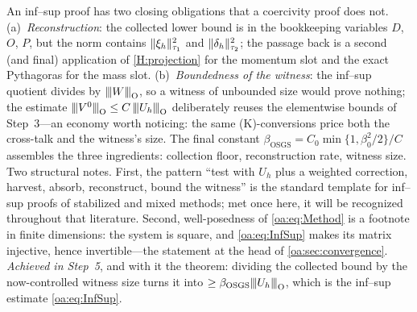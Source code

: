 \begin{pedagogy}
An inf--sup proof has two closing obligations that a coercivity proof does not.
(a)~\emph{Reconstruction}: the collected lower bound is in the bookkeeping
variables $D$, $O$, $P$, but the norm contains $\lVert \xi_h \rVert_{\tau_1}^2$ and
$\lVert \delta_h \rVert_{\tau_2}^2$; the passage back is a second (and final)
application of \cref{H:projection} for the momentum slot and the exact
Pythagoras for the mass slot. (b)~\emph{Boundedness of the witness}: the
inf--sup quotient divides by ${\lvert\kern-0.25ex\lvert\kern-0.25ex\lvert W \rvert\kern-0.25ex\rvert\kern-0.25ex\rvert}_{\mathrm O}$, so a witness of unbounded
size would prove nothing; the estimate ${\lvert\kern-0.25ex\lvert\kern-0.25ex\lvert V^0 \rvert\kern-0.25ex\rvert\kern-0.25ex\rvert}_{\mathrm O} \le
C\,{\lvert\kern-0.25ex\lvert\kern-0.25ex\lvert U_h \rvert\kern-0.25ex\rvert\kern-0.25ex\rvert}_{\mathrm O}$ deliberately reuses the elementwise bounds of
Step~3---an economy worth noticing: the same (K)-conversions price both the
cross-talk and the witness's size. The final constant $\beta_{\mathrm{OSGS}} =
C_0\min\{1,\beta_0^2/2\}/C$ assembles the three ingredients: collection floor,
reconstruction rate, witness size. Two structural notes. First, the pattern
``test with $U_h$ plus a weighted correction, harvest, absorb, reconstruct,
bound the witness'' is the standard template for inf--sup proofs of stabilized
and mixed methods; met once here, it will be recognized throughout that
literature. Second, well-posedness of \cref{oa:eq:Method} is a footnote in
finite dimensions: the system is square, and \cref{oa:eq:InfSup} makes its
matrix injective, hence invertible---the statement at the head of
\cref{oa:sec:convergence}.
\emph{Achieved in Step~5}, and with it the theorem: dividing the collected bound by
the now-controlled witness size turns it into
$\ge \beta_{\mathrm{OSGS}}{\lvert\kern-0.25ex\lvert\kern-0.25ex\lvert U_h \rvert\kern-0.25ex\rvert\kern-0.25ex\rvert}_{\mathrm O}$, which is the inf--sup estimate
\cref{oa:eq:InfSup}.
\end{pedagogy}

